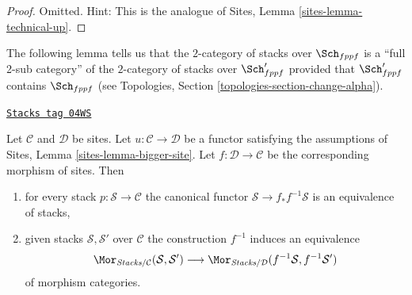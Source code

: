\begin{proof}
Omitted. Hint:
This is the analogue of Sites, Lemma \ref{sites-lemma-technical-up}.
\end{proof}

The following lemma tells us that the $2$-category of stacks
over $\Sch_{fppf}$ is a ``full 2-sub category'' of the
$2$-category of stacks over $\Sch'_{fppf}$ provided that
$\Sch'_{fppf}$ contains $\Sch_{fppf}$ (see
Topologies, Section \ref{topologies-section-change-alpha}).

\begin{lemma}
\label{stacks-lemma-bigger-site}
\href{https://stacks.math.columbia.edu/tag/04WS}{\texttt{Stacks tag 04WS}}

Let $\mathcal{C}$ and $\mathcal{D}$ be sites.
Let $u : \mathcal{C} \to \mathcal{D}$ be a functor satisfying the
assumptions of
Sites, Lemma \ref{sites-lemma-bigger-site}.
Let $f : \mathcal{D} \to \mathcal{C}$ be the corresponding
morphism of sites. Then
\begin{enumerate}
\item for every stack $p : \mathcal{S} \to \mathcal{C}$ the
canonical functor $\mathcal{S} \to f_*f^{-1}\mathcal{S}$ is
an equivalence of stacks,
\item given stacks $\mathcal{S}, \mathcal{S}'$ over $\mathcal{C}$
the construction $f^{-1}$
induces an equivalence
$$
\Mor_{\textit{Stacks}/\mathcal{C}}(\mathcal{S}, \mathcal{S}')
\longrightarrow
\Mor_{\textit{Stacks}/\mathcal{D}}(f^{-1}\mathcal{S}, f^{-1}\mathcal{S}')
$$
of morphism categories.
\end{enumerate}
\end{lemma}


